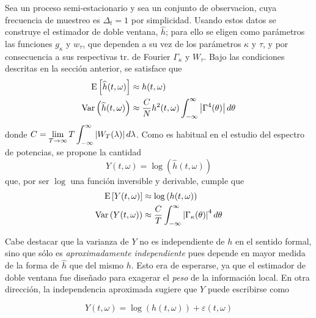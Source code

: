 Sea \xt un proceso semi-estacionario y sea \xtd un conjunto de observacion, cuya frecuencia de 
muestreo es $\Delta_t=1$ por simplicidad.
%
Usando estos datos se construye el estimador de doble ventana, $\widehat{h}$; para ello se eligen 
como parámetros las funciones $g_\kappa$ y $w_\tau$, que dependen a su vez de los parámetros 
$\kappa$ y $\tau$, y por consecuencia a sus respectivas tr. de Fourier $\Gamma_\kappa$ y $W_\tau$.
%
Bajo las condiciones descritas en la sección anterior, se satisface que
%
\begin{align*}
\mathrm{E}\left[ \widehat{h}(t,\omega) \right] &\approx h(t,\omega) \\
\mathrm{Var}\left( \widehat{h}(t,\omega) \right) &\approx 
\frac{C}{N} h^{2}(t,\omega) \int_{-\infty}^{\infty} \left| \Gamma^{4}(\theta) \right| d\theta
\end{align*}
%
donde $\displaystyle C = \lim_{T\rightarrow \infty} T \int_{-\infty}^{\infty} \left| W_T(\lambda) \right| d\lambda$.
%
Como es habitual en el estudio del espectro de potencias, se propone la cantidad 
\begin{equation}
Y(t,\omega) = \log\left(\widehat{h}(t,\omega)\right)
\end{equation}
que, por ser $\log$ una función inversible y derivable, cumple que
%
\begin{align*}
\mathrm{E}\left[ Y(t,\omega) \right] &\approx \log\left(h(t,\omega)\right) \\
\mathrm{Var}\left( Y(t,\omega) \right) &\approx 
\frac{C}{T} \int_{-\infty}^{\infty} \left| \Gamma_\kappa(\theta) \right|^{4} d\theta \\
\end{align*}

Cabe destacar que la varianza de $Y$ no es independiente de $h$ en el sentido formal, sino que 
sólo es \textit{aproximadamente independiente} pues depende en mayor medida de la forma de 
$\widehat{h}$ que del mismo $h$.
%
Esto era de esperarse, ya que el estimador de doble ventana fue diseñado para exagerar el 
\textit{peso} de la información local. 
%
En otra dirección, la independencia aproximada sugiere que $Y$ puede escribirse como

\begin{equation}
Y(t,\omega) = \log\left(h(t,\omega) \right) + \varepsilon(t,\omega)
\label{ye}
\end{equation}

